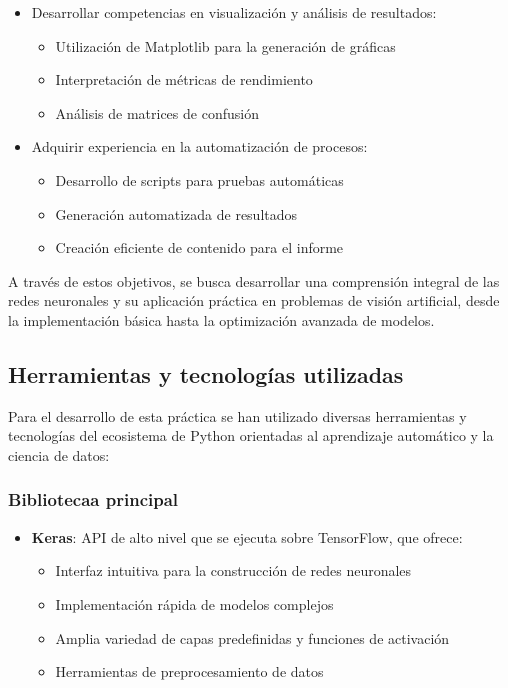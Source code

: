 \documentclass[11pt,a4paper]{article}
\begin{document}
\begin{itemize}
    \item Desarrollar competencias en visualización y análisis de resultados:
    \begin{itemize}
        \item Utilización de Matplotlib para la generación de gráficas
        \item Interpretación de métricas de rendimiento
        \item Análisis de matrices de confusión
    \end{itemize}

    \item Adquirir experiencia en la automatización de procesos:
    \begin{itemize}
        \item Desarrollo de scripts para pruebas automáticas
        \item Generación automatizada de resultados
        \item Creación eficiente de contenido para el informe
    \end{itemize}
\end{itemize}

A través de estos objetivos, se busca desarrollar una comprensión integral de las redes neuronales y su aplicación práctica en problemas de visión artificial, desde la implementación básica hasta la optimización avanzada de modelos.

\subsection{Herramientas y tecnologías utilizadas}

Para el desarrollo de esta práctica se han utilizado diversas herramientas y tecnologías del ecosistema de Python orientadas al aprendizaje automático y la ciencia de datos:

\subsubsection{Bibliotecaa principal}
\begin{itemize}
    \item \textbf{Keras}: API de alto nivel que se ejecuta sobre TensorFlow, que ofrece:
    \begin{itemize}
        \item Interfaz intuitiva para la construcción de redes neuronales
        \item Implementación rápida de modelos complejos
        \item Amplia variedad de capas predefinidas y funciones de activación
        \item Herramientas de preprocesamiento de datos
    \end{itemize}
\end{itemize}
\end{document}
